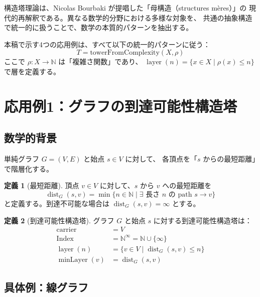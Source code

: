 \documentclass[a4paper,12pt]{ltjsarticle}
\theoremstyle{definition}
\newtheorem{definition}{定義}[section]
\newcommand{\N}{\mathbb{N}}
\newcommand{\ENat}{\mathbb{N}^\infty}
\DeclareMathOperator{\layer}{layer}
\DeclareMathOperator{\minLayer}{minLayer}
\DeclareMathOperator{\dist}{dist}
\begin{document}
構造塔理論は、Nicolas Bourbaki が提唱した「母構造（structures mères）」の
現代的再解釈である。異なる数学的分野における多様な対象を、
共通の抽象構造で統一的に扱うことで、数学の本質的パターンを抽出する。

本稿で示す4つの応用例は、すべて以下の統一的パターンに従う：
\[
T = \mathrm{towerFromComplexity}(X, \rho)
\]
ここで $\rho : X \to \N$ は「複雑さ関数」であり、
$\layer(n) = \{x \in X \mid \rho(x) \leq n\}$ で層を定義する。

\section{応用例1：グラフの到達可能性構造塔}

\subsection{数学的背景}

単純グラフ $G = (V, E)$ と始点 $s \in V$ に対して、
各頂点を「$s$ からの最短距離」で階層化する。

\begin{definition}[最短距離]
頂点 $v \in V$ に対して、$s$ から $v$ への最短距離を
\[
\dist_G(s, v) = \min\{n \in \N \mid \exists \text{ 長さ } n \text{ の path } s \to v\}
\]
と定義する。到達不可能な場合は $\dist_G(s, v) = \infty$ とする。
\end{definition}

\begin{definition}[到達可能性構造塔]
グラフ $G$ と始点 $s$ に対する到達可能性構造塔は：
\begin{align*}
\mathrm{carrier} &= V \\
\mathrm{Index} &= \ENat = \N \cup \{\infty\} \\
\layer(n) &= \{v \in V \mid \dist_G(s, v) \leq n\} \\
\minLayer(v) &= \dist_G(s, v)
\end{align*}
\end{definition}

\subsection{具体例：線グラフ}
\end{document}
